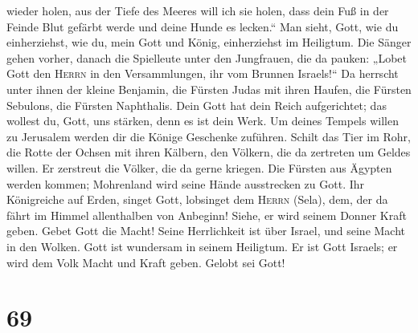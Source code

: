 wieder holen, aus der Tiefe des Meeres will ich sie holen,
 dass dein Fuß in der Feinde Blut gefärbt werde und deine
Hunde es lecken.``  Man sieht, Gott, wie du einherziehst,
wie du, mein Gott und König, einherziehst im Heiligtum. 
Die Sänger gehen vorher, danach die Spielleute unter den Jungfrauen, die
da pauken:  „Lobet Gott den \textsc{Herrn} in den
Versammlungen, ihr vom Brunnen Israels!{}``  Da herrscht
unter ihnen der kleine Benjamin, die Fürsten Judas mit ihren Haufen, die
Fürsten Sebulons, die Fürsten Naphthalis.  Dein Gott hat
dein Reich aufgerichtet; das wollest du, Gott, uns stärken, denn es ist
dein Werk.  Um deines Tempels willen zu Jerusalem werden
dir die Könige Geschenke zuführen.  Schilt das Tier im
Rohr, die Rotte der Ochsen mit ihren Kälbern, den Völkern, die da
zertreten um Geldes willen. Er zerstreut die Völker, die da gerne
kriegen.  Die Fürsten aus Ägypten werden kommen;
Mohrenland wird seine Hände ausstrecken zu Gott.  Ihr
Königreiche auf Erden, singet Gott, lobsinget dem \textsc{Herrn} (Sela),
 dem, der da fährt im Himmel allenthalben von Anbeginn!
Siehe, er wird seinem Donner Kraft geben.  Gebet Gott die
Macht! Seine Herrlichkeit ist über Israel, und seine Macht in den
Wolken.  Gott ist wundersam in seinem Heiligtum. Er ist
Gott Israels; er wird dem Volk Macht und Kraft geben. Gelobt sei Gott!

\hypertarget{section-68}{%
\section{69}\label{section-68}}

